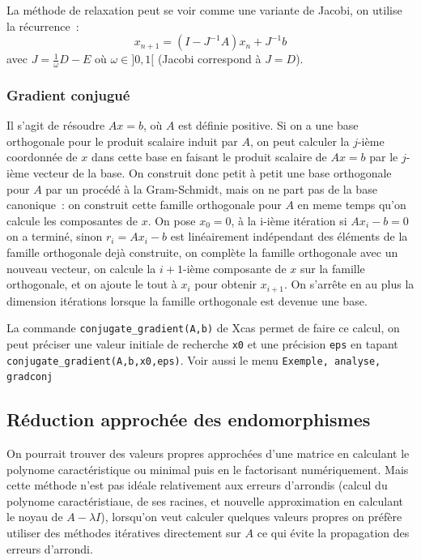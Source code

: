\documentclass[a4paper,11pt]{article}
\begin{document}
La m\'ethode de relaxation peut se voir comme une variante de Jacobi, on utilise la r\'ecurrence~:
$$ x_{n+1} = (I-J^{-1} A) x_n +J^{-1} b$$
avec $J=\frac1\omega D-E$ o\`u $\omega \in ]0,1[$ (Jacobi
correspond \`a $J=D$).

\subsubsection{Gradient conjugu\'e}
Il s'agit de résoudre $Ax=b$, où $A$ est définie positive. 
Si on a une base orthogonale pour le produit scalaire induit par $A$, 
on peut calculer la $j$-ième coordonn\'ee de $x$ 
dans cette base en faisant le produit scalaire de 
$Ax=b$ par le $j$-ième vecteur de la base. 
On construit donc petit à petit une base orthogonale 
pour $A$ par un procédé à la Gram-Schmidt, 
mais on ne part pas de la base canonique~: 
on construit cette famille orthogonale pour $A$ 
en meme temps qu'on calcule les composantes de $x$.
On pose $x_0=0$, à la i-ième itération si $Ax_i-b=0$ 
on a terminé, sinon $r_i=Ax_i-b$ 
est linéairement indépendant des éléments 
de la famille orthogonale dejà construite, 
on complète la famille orthogonale avec un nouveau vecteur, 
on calcule la $i+1$-ième composante de $x$ 
sur la famille orthogonale, et on ajoute le tout à $x_i$ 
pour obtenir $x_{i+1}$. 
On s'arr\^ete en au plus la dimension itérations 
lorsque la famille orthogonale est devenue une base. 

La commande \verb|conjugate_gradient(A,b)| de Xcas permet de faire ce
calcul, on peut préciser une valeur initiale de recherche \verb|x0|
et une précision \verb|eps| en tapant \verb|conjugate_gradient(A,b,x0,eps)|.
Voir aussi le menu {\tt Exemple, analyse, gradconj}
 
\subsection{Réduction approchée des endomorphismes}
On pourrait trouver des valeurs propres approchées d'une matrice
en calculant le polynome caractéristique ou minimal puis en le
factorisant numériquement. Mais cette méthode n'est pas idéale
relativement aux erreurs d'arrondis (calcul du polynome caractéristiaue,
de ses racines, et nouvelle approximation en calculant le noyau
de $A-\lambda I$), lorsqu'on veut calculer quelques valeurs propres
on préfère utiliser des méthodes itératives directement sur $A$
ce qui évite la propagation des erreurs d'arrondi.
\end{document}
